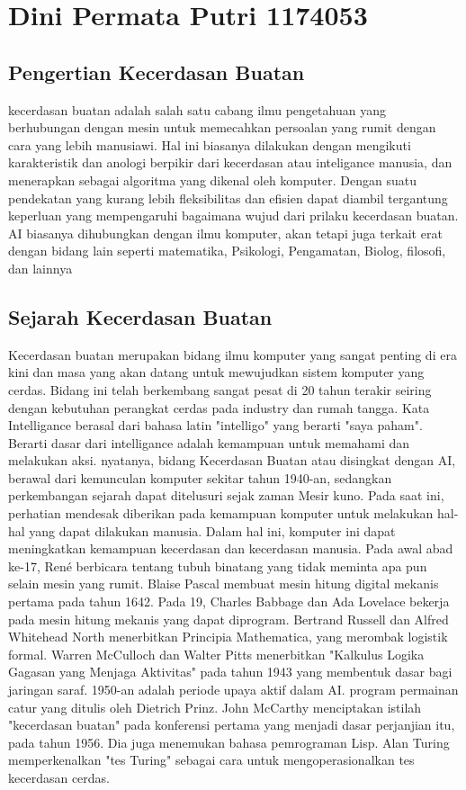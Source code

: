 \section{Dini Permata Putri 1174053}
\subsection{Pengertian Kecerdasan Buatan}
kecerdasan buatan adalah salah satu cabang ilmu pengetahuan yang berhubungan dengan mesin untuk memecahkan persoalan yang rumit dengan cara yang lebih manusiawi. Hal ini biasanya dilakukan dengan mengikuti karakteristik dan anologi berpikir dari kecerdasan  atau inteligance manusia, dan menerapkan sebagai algoritma yang dikenal oleh komputer.
Dengan suatu pendekatan yang kurang lebih fleksibilitas dan efisien dapat diambil tergantung keperluan yang mempengaruhi bagaimana wujud dari prilaku kecerdasan buatan. AI biasanya dihubungkan dengan ilmu komputer, akan tetapi juga terkait erat dengan bidang lain seperti matematika, Psikologi, Pengamatan, Biolog, filosofi, dan lainnya
\subsection{Sejarah Kecerdasan Buatan}
Kecerdasan buatan merupakan bidang ilmu komputer yang sangat penting di era kini dan masa yang akan datang untuk mewujudkan sistem komputer yang cerdas. Bidang ini telah berkembang sangat pesat di 20 tahun terakir seiring dengan kebutuhan perangkat cerdas pada industry dan rumah tangga.
Kata Intelligance berasal dari bahasa latin "intelligo" yang berarti "saya paham". Berarti dasar dari intelligance adalah kemampuan untuk memahami dan melakukan aksi. nyatanya, bidang Kecerdasan Buatan atau disingkat dengan AI, berawal dari kemunculan komputer sekitar tahun 1940-an, sedangkan perkembangan sejarah dapat ditelusuri sejak zaman Mesir kuno. Pada saat ini, perhatian mendesak diberikan pada kemampuan komputer untuk melakukan hal-hal yang dapat dilakukan manusia. Dalam hal ini, komputer ini dapat meningkatkan kemampuan kecerdasan dan kecerdasan manusia.
Pada awal abad ke-17, René berbicara tentang tubuh binatang yang tidak meminta apa pun selain mesin yang rumit. Blaise Pascal membuat mesin hitung digital mekanis pertama pada tahun 1642. Pada 19, Charles Babbage dan Ada Lovelace bekerja pada mesin hitung mekanis yang dapat diprogram. Bertrand Russell dan Alfred Whitehead North menerbitkan Principia Mathematica, yang merombak logistik formal. Warren McCulloch dan Walter Pitts menerbitkan "Kalkulus Logika Gagasan yang Menjaga Aktivitas" pada tahun 1943 yang membentuk dasar bagi jaringan saraf.
1950-an adalah periode upaya aktif dalam AI. program permainan catur yang ditulis oleh Dietrich Prinz. John McCarthy menciptakan istilah "kecerdasan buatan" pada konferensi pertama yang menjadi dasar perjanjian itu, pada tahun 1956. Dia juga menemukan bahasa pemrograman Lisp. Alan Turing memperkenalkan "tes Turing" sebagai cara untuk mengoperasionalkan tes kecerdasan cerdas. 
